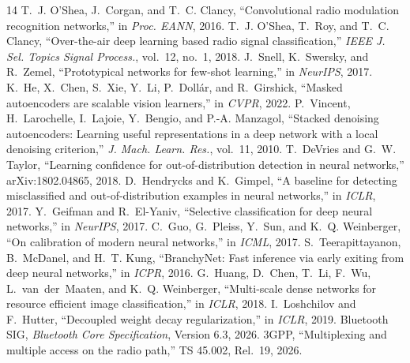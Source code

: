 \documentclass[10pt,twocolumn]{article}
\begin{document}
\begin{thebibliography}{14}\footnotesize
\setlength{\itemsep}{0pt}
 T.~J. O'Shea, J.~Corgan, and T.~C. Clancy,
``Convolutional radio modulation recognition networks,'' in \emph{Proc.
EANN}, 2016.
 T.~J. O'Shea, T.~Roy, and T.~C. Clancy, ``Over-the-air
deep learning based radio signal classification,'' \emph{IEEE J. Sel.
Topics Signal Process.}, vol.~12, no.~1, 2018.
 J.~Snell, K.~Swersky, and R.~Zemel, ``Prototypical
networks for few-shot learning,'' in \emph{NeurIPS}, 2017.
 K.~He, X.~Chen, S.~Xie, Y.~Li, P.~Doll\'ar, and
R.~Girshick, ``Masked autoencoders are scalable vision learners,'' in
\emph{CVPR}, 2022.
 P.~Vincent, H.~Larochelle, I.~Lajoie, Y.~Bengio, and
P.-A. Manzagol, ``Stacked denoising autoencoders: Learning useful
representations in a deep network with a local denoising criterion,''
\emph{J. Mach. Learn. Res.}, vol.~11, 2010.
 T.~DeVries and G.~W. Taylor, ``Learning confidence
for out-of-distribution detection in neural networks,''
arXiv:1802.04865, 2018.
 D.~Hendrycks and K.~Gimpel, ``A baseline for
detecting misclassified and out-of-distribution examples in neural
networks,'' in \emph{ICLR}, 2017.
 Y.~Geifman and R.~El-Yaniv, ``Selective
classification for deep neural networks,'' in \emph{NeurIPS}, 2017.
 C.~Guo, G.~Pleiss, Y.~Sun, and K.~Q. Weinberger, ``On
calibration of modern neural networks,'' in \emph{ICML}, 2017.
 S.~Teerapittayanon, B.~McDanel, and H.~T.
Kung, ``BranchyNet: Fast inference via early exiting from deep neural
networks,'' in \emph{ICPR}, 2016.
 G.~Huang, D.~Chen, T.~Li, F.~Wu, L.~van~der~Maaten,
and K.~Q. Weinberger, ``Multi-scale dense networks for resource efficient
image classification,'' in \emph{ICLR}, 2018.
 I.~Loshchilov and F.~Hutter, ``Decoupled weight
decay regularization,'' in \emph{ICLR}, 2019.
 Bluetooth SIG, \emph{Bluetooth Core Specification},
Version 6.3, 2026.
 3GPP, ``Multiplexing and multiple access on the radio
path,'' TS 45.002, Rel.~19, 2026.
\end{thebibliography}
\end{document}
